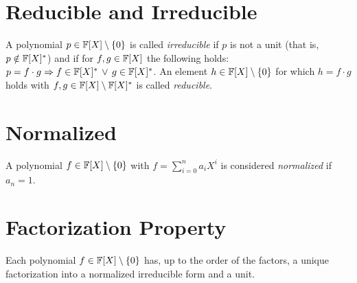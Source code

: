 \section{Reducible and Irreducible}

A polynomial \(p \in \mathbb{F}[X] \setminus \{0\}\) is called \emph{irreducible} if \(p\) is not a unit (that is, \(p \notin \mathbb{F}[X]^{\ast}\)) and if for
\(f, g \in \mathbb{F}[X]\) the following holds: \(p = f \cdot g \Rightarrow f \in \mathbb{F}[X]^{\ast} \,\vee\, g \in \mathbb{F}[X]^{\ast}\). An element \(h \in \mathbb{F}[X] \setminus \{0\}\) for which
\(h = f \cdot g\) holds with \(f, g \in \mathbb{F}[X] \setminus \mathbb{F}[X]^{\ast}\)  is called \emph{reducible}.

\section{Normalized}

A polynomial \(f \in \mathbb{F}[X] \setminus \{0\}\) with \(f = \sum_{i = 0}^{n} a_i X^i\) is considered \emph{normalized} if \(a_n = 1\).

\section{Factorization Property}

Each polynomial \(f \in \mathbb{F}[X] \setminus \{0\}\) has, up to the order of the factors, a unique factorization into a normalized irreducible form and
a unit.
